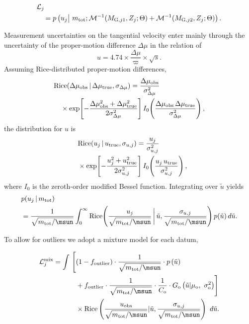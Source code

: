 \begin{align}
    &\mathcal{L}_j \\
    &\quad = p \left(u_j \big|\ m_{\rm tot};\mathcal{M}^{-1}(M_{{\rm G},j1}, Z_j;\Theta) + \mathcal{M}^{-1}(M_{{\rm G},j2},Z_j;\Theta) \right). \notag
\end{align}

Measurement uncertainties on the tangential velocity enter mainly through the uncertainty of the proper-motion difference $\Delta\mu$ in the relation of 
\begin{equation}
    u = 4.74 \times \frac{\Delta\mu}{\varpi} \times \sqrt{s}.
\end{equation}
Assuming Rice-distributed proper-motion differences,
\begin{align}
    &\mathrm{Rice}(\Delta\mu_{\rm obs}\,|\,\Delta\mu_{\rm true},\sigma_{\Delta\mu}) = \frac{\Delta\mu_{\rm obs}}{\sigma_{\Delta\mu}^2} \notag\\
    &\quad \times \exp\!\left[-\frac{\Delta\mu_{\rm obs}^2 + \Delta\mu_{\rm true}^2}{2\sigma_{\Delta\mu}^2}\right] I_0\!\left(\frac{\Delta\mu_{\rm obs}\,\Delta\mu_{\rm true}}{\sigma_{\Delta\mu}^2}\right),
\end{align}
the distribution for $u$ is
\begin{align}
    &\mathrm{Rice}(u_j\,|\,u_{\rm true},\sigma_{u,j}) = \frac{u_j}{\sigma_{u,j}^2}  \notag\\
    \quad &\times \exp\!\left[-\frac{u_j^2 + u_{\rm true}^2}{2\sigma_{u,j}^2}\right] I_0\!\left(\frac{u_j\,u_{\rm true}}{\sigma_{u,j}^2}\right),
\end{align}
where $I_0$ is the zeroth-order modified Bessel function. Integrating over $\tilde{u}$ yields
\begin{align}
    &p(u_j\,|\,m_{\rm tot}) \\
    &= \frac{1}{\sqrt{m_{\rm tot}/\msun}} \int_0^\infty \mathrm{Rice}\!\left(\frac{u_j}{\sqrt{m_{\rm tot}/\msun}} \,\bigg|\, \tilde{u}, \frac{\sigma_{u,j}}{\sqrt{m_{\rm tot}/\msun}}\right) p(\tilde{u})\, d\tilde{u}. \notag
\end{align}

To allow for outliers we adopt a mixture model for each datum,

\begin{equation}
\begin{aligned}
    \mathcal{L}^{\rm mix}_j = \int~ \Biggl[ & (1-f_{\mathrm{outlier}}) \cdot \dfrac{1}{\sqrt{m_{\mathrm{tot}}/\msun}} \cdot p\left( \tilde{u} \right) \\
    & + f_{\mathrm{outlier}} \cdot \dfrac{1}{\sqrt{m_{\mathrm{tot}}/\msun}} \cdot \dfrac{1}{C_{\mathrm{o}}} \cdot G_{\mathrm{o}}\left( \tilde{u}|\mu_{\mathrm{o}},~\sigma^2_{\mathrm{o}} \right) \Biggr] \\
    & \times \mathrm{Rice} \left(\dfrac{u_{\mathrm{obs}}}{\sqrt{m_{\mathrm{tot}}/\msun}}|\tilde{u},\dfrac{\sigma_{u,j}}{\sqrt{m_{\mathrm{tot}}/\msun}}\right) ~d\tilde{u}.
\end{aligned}
\end{equation}


